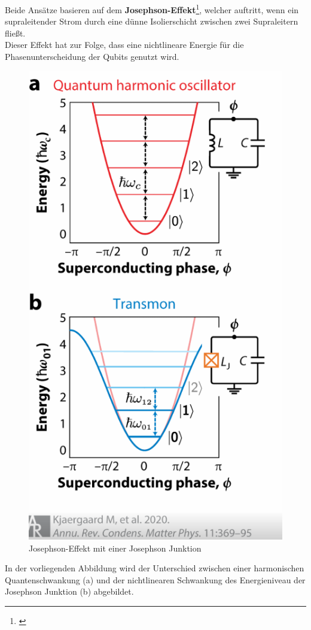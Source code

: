 Beide Ansätze basieren auf dem \textbf{Josephson-Effekt}\footnote{\cite{kjaergaard_superconducting_2020}}, welcher auftritt, wenn ein supraleitender Strom durch eine dünne Isolierschicht zwischen zwei Supraleitern fließt.\\
Dieser Effekt hat zur Folge, dass eine nichtlineare Energie für die Phasenunterscheidung der Qubits genutzt wird.\\

\begin{figure}[H]
    \centering
    \includegraphics[width=0.75\linewidth]{img/JJ.png}
    \caption{Josephson-Effekt mit einer Josephson Junktion \cite{kjaergaard_superconducting_2020}}
    \label{fig:Josephson-junktion}
\end{figure}

In der vorliegenden Abbildung wird der Unterschied zwischen einer harmonischen Quantenschwankung (a) und der nichtlinearen Schwankung des Energieniveau der Josephson Junktion (b) abgebildet.\\

